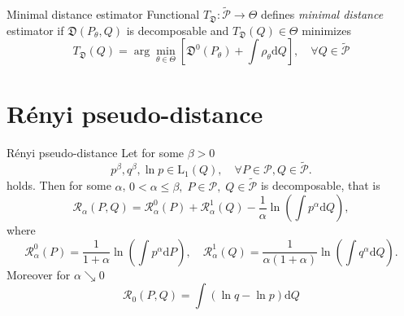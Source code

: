 \documentclass[11pt,a4paper]{beamer}
\begin{document}
%		

\begin{frame}{Minimal distance estimator}
	Functional $T_\mathfrak{D}:\mathcal{\tilde{P}} \rightarrow \Theta$ defines \emph{minimal distance} estimator if $\mathfrak{D}(P_\theta,Q)$ is decomposable and $T_\mathfrak{D}(Q) \in \Theta$ minimizes 
	\begin{equation*}
		T_\mathfrak{D}(Q) = \arg \min_{\theta \in \Theta} \left[ \mathfrak{D}^0 (P_\theta) + \int \rho_\theta \mathrm{d}Q \right], \quad \forall Q \in \mathcal{\tilde{P}}
	\end{equation*}
\end{frame}

\section{Rényi pseudo-distance} %

\begin{frame}{Rényi pseudo-distance}
	Let for some $\beta>0$
	\begin{equation*}
			p^\beta, q^\beta,\ln{p} \in \mathrm{L}_1(Q), \quad \forall P \in \mathcal{P}, Q \in \mathcal{\tilde{P}}.
	\end{equation*}
	holds. Then for some $\alpha$, $0 < \alpha \leq \beta,\; P \in \mathcal{P}, \; Q \in \mathcal{\tilde{P}} $ is decomposable, that is 
	\begin{equation*}
		\mathcal{R}_\alpha (P,Q) = \mathcal{R}_\alpha^0 (P) + \mathcal{R}_\alpha^1 (Q) - \dfrac{1}{\alpha} \ln{\left( \int{p^\alpha \mathrm{d}Q } \right)},
	\end{equation*}	
	where 
	\begin{equation*}
		\mathcal{R}_\alpha^0 (P) = \dfrac{1}{1+\alpha}\ln{\left( \int{p^\alpha \mathrm{d}P } \right)}, \quad \mathcal{R}_\alpha^1 (Q) = \dfrac{1}{\alpha (1+\alpha)}\ln{\left( \int{q^\alpha \mathrm{d}Q } \right)}.
	\end{equation*}
	Moreover for $\alpha \searrow 0$
	\begin{equation*}
		\mathcal{R}_0 (P,Q) = \int{\left( \ln{q} - \ln{p} \right)\mathrm{d}Q}
	\end{equation*}
\end{frame}
\end{document}
